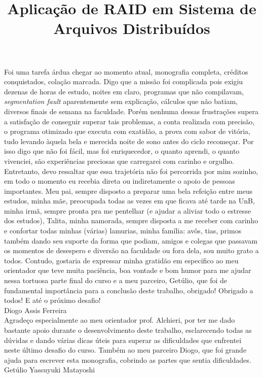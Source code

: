 \documentclass[bacharelado]{unb-cic}
\title{Aplicação de RAID em Sistema de Arquivos Distribuídos}
\begin{document}
\maketitle

\pretextual

\begin{agradecimentos}
Foi uma tarefa árdua chegar ao momento atual, monografia completa, créditos conquistados, colação marcada. Digo que a missão foi complicada pois exigiu dezenas de horas de estudo, noites em claro, programas que não compilavam, \textit{segmentation fault} aparentemente sem explicação, cálculos que não batiam, diversos finais de semana na faculdade. Porém nenhuma dessas frustrações supera a satisfação de conseguir superar tais problemas, a conta realizada com precisão, o programa otimizado que executa com exatidão, a prova com sabor de vitória, tudo levando àquela bela e merecida noite de sono antes do ciclo recomeçar. Por isso digo que não foi fácil, mas foi enriquecedor, o quanto aprendi, o quanto vivenciei, são experiências preciosas que carregarei com carinho e orgulho. Entretanto, devo ressaltar que essa trajetória não foi percorrida por mim sozinho, em todo o momento eu recebia direta ou indiretamente o apoio de pessoas importantes. Meu pai, sempre disposto a preparar uma bela refeição entre meus estudos, minha mãe, preocupada todas as vezes em que ficava até tarde na UnB, minha irmã, sempre pronta pra me pentelhar (e ajudar a aliviar todo o estresse dos estudos), Talita, minha namorada, sempre disposta a me receber com carinho e confortar todas minhas (várias) lamurias, minha família: avôs, tias, primos também dando seu suporte da forma que podiam, amigos e colegas que passavam os momentos de desespero e diversão na faculdade ou fora dela, sou muito grato a todos. Contudo, gostaria de expressar minha gratidão em especifico ao meu orientador que teve muita paciência, boa vontade e bom humor para me ajudar nessa tortuosa parte final do curso e a meu parceiro, Getúlio, que foi de fundamental importância para a conclusão deste trabalho, obrigado! Obrigado a todos! E até o próximo desafio!
\\

Diogo Assis Ferreira
\\

Agradeço especialmente ao meu orientador prof. Alchieri, por ter me dado bastante apoio durante o desenvolvimento deste trabalho, esclarecendo todas as dúvidas e dando várias dicas úteis para superar as dificuldades que enfrentei neste último desafio do curso. Também ao meu parceiro Diogo, que foi grande ajuda para escrever esta monografia, cobrindo as partes que sentia dificuldades.
\\

Getúlio Yassuyuki Matayoshi
\\

\end{agradecimentos}
\end{document}
